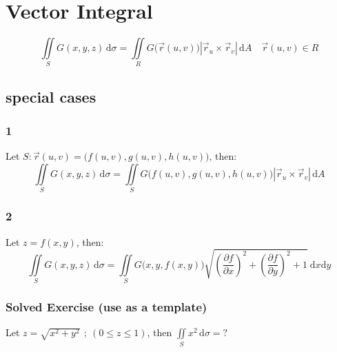 \documentclass[12pt, fleqn]{book}
\newcommand{\D}{\mathrm{d}}
\newcommand{\iis}{\iint\limits_S}
\newcommand{\rutrv}{\vec{r}_u \times \vec{r}_v\right}
\newcommand{\xy}{(x, y)}
\newcommand{\xyz}{(x, y, z)}
\newcommand{\uv}{(u, v)}
\newcommand{\rond}[2]{\frac{\partial #1}{\partial #2}}
\begin{document}
	\section{Vector Integral}
		\begin{equation}
			\iis G\xyz \, \D \sigma 
			  = \iint\limits_R G\big(\vec{r}\uv\big) 
			    \left|\rutrv| 
			    \, \D A 
			    \quad \vec{r}\uv \in R
		\end{equation}
		\subsection{special cases}
			\subsubsection{1}
				Let $S: \vec{r}\uv = \big(f\uv, g\uv, h\uv\big)$, then:
			 	\begin{equation}
			 		\iis G\xyz \, \D \sigma
			 		  = \iis G\big(f\uv, g\uv, h\uv\big) 
			 		    \left|\rutrv| 
			 		    \, \D A
			 	\end{equation}
		 	\subsubsection{2}
		 		Let $z = f\xy$, then:
		 		\begin{equation}
		 			\iis G\xyz \, \D \sigma
		 			  = \iis G\big(x, y, f\xy\big)
		 			  \sqrt{
		 			  	(\rond{f}{x})^2 + 
		 			  	(\rond{f}{y})^2 + 
		 			  	1
	 			  	  } 
 			  	       \ \D x \D y
		 		\end{equation}
	 		\subsubsection{Solved Exercise (use as a template)}
	 			Let $z = \sqrt{x^2 + y^2} \ \, ; \ (0 \le z \le 1)$, then $\iis x^2 \, \D \sigma = ?$
	 			
\end{document}

